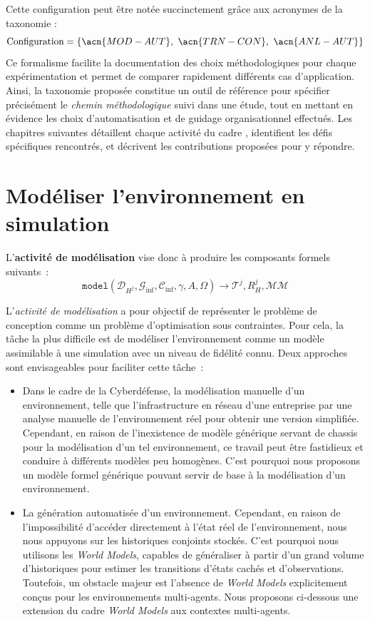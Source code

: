 Cette configuration peut être notée succinctement grâce aux acronymes de la taxonomie :
\[
  \text{Configuration} = \{\acn{MOD-AUT},\ \acn{TRN-CON},\ \acn{ANL-AUT}\}
\]
Ce formalisme facilite la documentation des choix méthodologiques pour chaque expérimentation et permet de comparer rapidement différents cas d'application.
%
Ainsi, la taxonomie proposée constitue un outil de référence pour spécifier précisément le \textit{chemin méthodologique} suivi dans une étude, tout en mettant en évidence les choix d'automatisation et de guidage organisationnel effectués.
Les chapitres suivantes détaillent chaque activité du cadre , identifient les défis spécifiques rencontrés, et décrivent les contributions proposées pour y répondre.


\clearpage
\thispagestyle{empty}
\null
\newpage

\chapter{Modéliser l'environnement en simulation}
\label{chap:modelling}

L'\textbf{activité de modélisation} vise donc à produire les composants formels suivants~:
\begin{displaymath}
  \texttt{model}(\mathcal{D}_{H^j}, \mathcal{G}_{\text{inf}}, \mathcal{C}_{\text{inf}}, \gamma, A, \Omega) \rightarrow \mathcal{T}^j, R^j_H, \mathcal{MM}
\end{displaymath}


\noindent L'\textit{activité de modélisation} a pour objectif de représenter le problème de conception comme un problème d'optimisation sous contraintes. Pour cela, la tâche la plus difficile est de modéliser l'environnement comme un modèle assimilable à une simulation avec un niveau de fidélité connu. Deux approches sont envisageables pour faciliter cette tâche~:
\begin{itemize}
  \item Dans le cadre de la Cyberdéfense, la modélisation manuelle d'un environnement, telle que l'infrastructure en réseau d'une entreprise par une analyse manuelle de l'environnement réel pour obtenir une version simplifiée. Cependant, en raison de l'inexistence de modèle générique servant de chassis pour la modélisation d'un tel environnement, ce travail peut être fastidieux et conduire à différents modèles peu homogènes. C'est pourquoi nous proposons un modèle formel générique pouvant servir de base à la modélisation d'un environnement.
  \item La génération automatisée d'un environnement. Cependant, en raison de l'impossibilité d'accéder directement à l'état réel de l'environnement, nous nous appuyons sur les historiques conjoints stockés. C'est pourquoi nous utilisons les \textit{World Models}, capables de généraliser à partir d'un grand volume d'historiques pour estimer les transitions d'états cachés et d'observations. Toutefois, un obstacle majeur est l'absence de \textit{World Models} explicitement conçus pour les environnements multi-agents. Nous proposons ci-dessous une extension du cadre \textit{World Models} aux contextes multi-agents.
\end{itemize}

